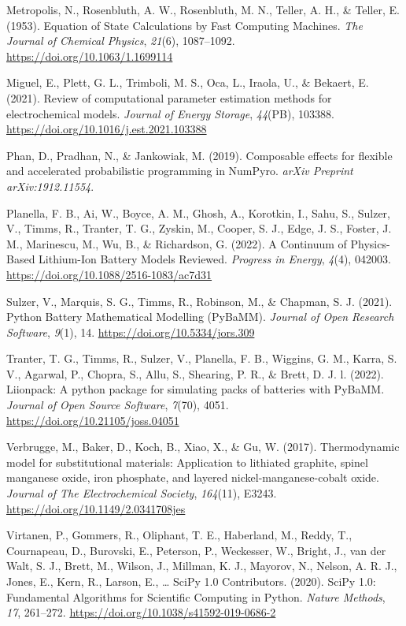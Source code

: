 \documentclass[
]{article}
\newlength{\cslhangindent}
\newenvironment{CSLReferences}[2] %
 {\begin{list}{}{%
  \setlength{\itemindent}{0pt}
  \setlength{\leftmargin}{0pt}
  \setlength{\parsep}{0pt}
  \ifodd #1
   \setlength{\leftmargin}{\cslhangindent}
   \setlength{\itemindent}{-1\cslhangindent}
  \fi
  \setlength{\itemsep}{#2\baselineskip}}}
 {\end{list}}
\begin{document}
\begin{CSLReferences}{1}{0}
Metropolis, N., Rosenbluth, A. W., Rosenbluth, M. N., Teller, A. H., \&
Teller, E. (1953). Equation of {State} {Calculations} by {Fast}
{Computing} {Machines}. \emph{The Journal of Chemical Physics},
\emph{21}(6), 1087--1092. \url{https://doi.org/10.1063/1.1699114}

Miguel, E., Plett, G. L., Trimboli, M. S., Oca, L., Iraola, U., \&
Bekaert, E. (2021). Review of computational parameter estimation methods
for electrochemical models. \emph{Journal of Energy Storage},
\emph{44}(PB), 103388. \url{https://doi.org/10.1016/j.est.2021.103388}

Phan, D., Pradhan, N., \& Jankowiak, M. (2019). Composable effects for
flexible and accelerated probabilistic programming in NumPyro.
\emph{arXiv Preprint arXiv:1912.11554}.

Planella, F. B., Ai, W., Boyce, A. M., Ghosh, A., Korotkin, I., Sahu,
S., Sulzer, V., Timms, R., Tranter, T. G., Zyskin, M., Cooper, S. J.,
Edge, J. S., Foster, J. M., Marinescu, M., Wu, B., \& Richardson, G.
(2022). {A Continuum of Physics-Based Lithium-Ion Battery Models
Reviewed}. \emph{Progress in Energy}, \emph{4}(4), 042003.
\url{https://doi.org/10.1088/2516-1083/ac7d31}

Sulzer, V., Marquis, S. G., Timms, R., Robinson, M., \& Chapman, S. J.
(2021). {Python Battery Mathematical Modelling (PyBaMM)}. \emph{Journal
of Open Research Software}, \emph{9}(1), 14.
\url{https://doi.org/10.5334/jors.309}

Tranter, T. G., Timms, R., Sulzer, V., Planella, F. B., Wiggins, G. M.,
Karra, S. V., Agarwal, P., Chopra, S., Allu, S., Shearing, P. R., \&
Brett, D. J. l. (2022). Liionpack: A python package for simulating packs
of batteries with PyBaMM. \emph{Journal of Open Source Software},
\emph{7}(70), 4051. \url{https://doi.org/10.21105/joss.04051}

Verbrugge, M., Baker, D., Koch, B., Xiao, X., \& Gu, W. (2017).
Thermodynamic model for substitutional materials: Application to
lithiated graphite, spinel manganese oxide, iron phosphate, and layered
nickel-manganese-cobalt oxide. \emph{Journal of The Electrochemical
Society}, \emph{164}(11), E3243.
\url{https://doi.org/10.1149/2.0341708jes}

Virtanen, P., Gommers, R., Oliphant, T. E., Haberland, M., Reddy, T.,
Cournapeau, D., Burovski, E., Peterson, P., Weckesser, W., Bright, J.,
van der Walt, S. J., Brett, M., Wilson, J., Millman, K. J., Mayorov, N.,
Nelson, A. R. J., Jones, E., Kern, R., Larson, E., \ldots{} SciPy 1.0
Contributors. (2020). {{SciPy} 1.0: Fundamental Algorithms for
Scientific Computing in Python}. \emph{Nature Methods}, \emph{17},
261--272. \url{https://doi.org/10.1038/s41592-019-0686-2}


\end{CSLReferences}
\end{document}
